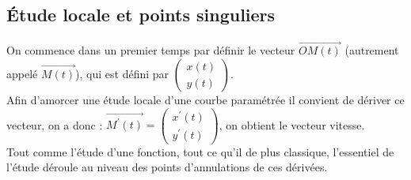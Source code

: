 \subsection{Étude locale et points singuliers}
On commence dans un premier temps par  définir le vecteur $\overrightarrow{OM(t)}$ (autrement appelé $\overrightarrow{M(t)}$), qui est défini par $\begin{pmatrix}x(t)\\y(t)\end{pmatrix}$.\\
Afin d'amorcer une étude locale d'une courbe paramétrée il convient de dériver ce vecteur, on a donc : $\overrightarrow{M^{\prime}(t)}=\begin{pmatrix}x^{\prime}(t)\\y^{\prime}(t)\end{pmatrix}$, on obtient le vecteur vitesse.\\
Tout comme l'étude d'une fonction, tout ce qu'il de plus classique, l'essentiel de l'étude déroule au niveau des points d'annulations de ces dérivées.
